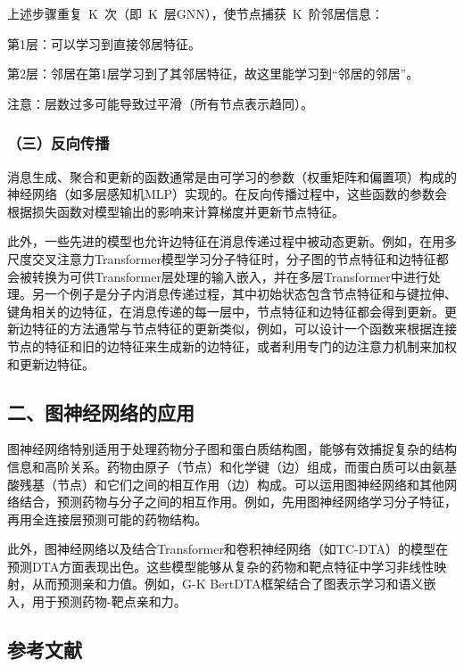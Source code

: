 上述步骤重复~K~次（即~K~层GNN），使节点捕获~K~阶邻居信息：

第1层：可以学习到直接邻居特征。

第2层：邻居在第1层学习到了其邻居特征，故这里能学习到``邻居的邻居''。

注意：层数过多可能导致过平滑（所有节点表示趋同）。

\hypertarget{ux4e09ux53cdux5411ux4f20ux64ad}{%
\subsubsection{（三）反向传播}\label{ux4e09ux53cdux5411ux4f20ux64ad}}

消息生成、聚合和更新的函数通常是由可学习的参数（权重矩阵和偏置项）构成的神经网络（如多层感知机MLP）实现的。在反向传播过程中，这些函数的参数会根据损失函数对模型输出的影响来计算梯度并更新节点特征。

此外，一些先进的模型也允许边特征在消息传递过程中被动态更新。例如，在用多尺度交叉注意力Transformer模型学习分子特征时，分子图的节点特征和边特征都会被转换为可供Transformer层处理的输入嵌入，并在多层Transformer中进行处理。另一个例子是分子内消息传递过程，其中初始状态包含节点特征和与键拉伸、键角相关的边特征，在消息传递的每一层中，节点特征和边特征都会得到更新。更新边特征的方法通常与节点特征的更新类似，例如，可以设计一个函数来根据连接节点的特征和旧的边特征来生成新的边特征，或者利用专门的边注意力机制来加权和更新边特征。

\hypertarget{ux4e8cux56feux795eux7ecfux7f51ux7edcux7684ux5e94ux7528}{%
\subsection{二、图神经网络的应用}\label{ux4e8cux56feux795eux7ecfux7f51ux7edcux7684ux5e94ux7528}}

图神经网络特别适用于处理药物分子图和蛋白质结构图，能够有效捕捉复杂的结构信息和高阶关系。药物由原子（节点）和化学键（边）组成，而蛋白质可以由氨基酸残基（节点）和它们之间的相互作用（边）构成。可以运用图神经网络和其他网络结合，预测药物与分子之间的相互作用。例如，先用图神经网络学习分子特征，再用全连接层预测可能的药物结构。

此外，图神经网络以及结合Transformer和卷积神经网络（如TC-DTA）的模型在预测DTA方面表现出色。这些模型能够从复杂的药物和靶点特征中学习非线性映射，从而预测亲和力值。例如，G-K BertDTA框架结合了图表示学习和语义嵌入，用于预测药物-靶点亲和力。

\hypertarget{ux53c2ux8003ux6587ux732e-41}{%
\subsection{参考文献}\label{ux53c2ux8003ux6587ux732e-41}}

